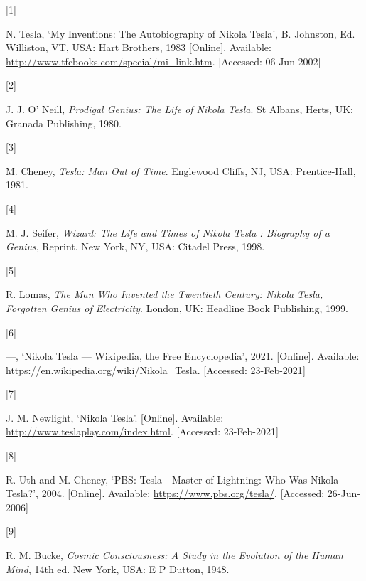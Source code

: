\documentclass[
  12pt,
  british,
  a4paper,
  rgb,
  dvipsnames,
  svgnames,
  hyphens]{article}
\newlength{\cslhangindent}
\newlength{\csllabelwidth}
\newenvironment{CSLReferences}[2] %
 {%
  \setlength{\parindent}{0pt}
  \ifodd #1 \everypar{\setlength{\hangindent}{\cslhangindent}}\ignorespaces\fi
  \ifnum #2 > 0
  \setlength{\parskip}{#2\baselineskip}
  \fi
 }%
 {}
\newcommand{\CSLLeftMargin}[1]{\parbox[t]{\csllabelwidth}{#1}}
\newcommand{\CSLRightInline}[1]{\parbox[t]{\linewidth - \csllabelwidth}{#1}\break}
\begin{document}
\hypertarget{refs}{}
\begin{CSLReferences}{0}{0}
\leavevmode{}%
\CSLLeftMargin{{[}1{]} }
\CSLRightInline{N. Tesla, {`{My Inventions: The Autobiography of Nikola
Tesla}'}, B. Johnston, Ed. Williston, VT, USA: Hart Brothers, 1983
{[}Online{]}. Available:
\url{http://www.tfcbooks.com/special/mi_link.htm}. {[}Accessed:
06-Jun-2002{]}}

\leavevmode{}%
\CSLLeftMargin{{[}2{]} }
\CSLRightInline{J. J. O' Neill, \emph{{Prodigal Genius: The Life of
Nikola Tesla}}. St Albans, Herts, UK: Granada Publishing, 1980. }

\leavevmode{}%
\CSLLeftMargin{{[}3{]} }
\CSLRightInline{M. Cheney, \emph{{Tesla: Man Out of Time}}. Englewood
Cliffs, NJ, USA: Prentice-Hall, 1981. }

\leavevmode{}%
\CSLLeftMargin{{[}4{]} }
\CSLRightInline{M. J. Seifer, \emph{{Wizard: The Life and Times of
Nikola Tesla : Biography of a Genius}}, Reprint. New York, NY, USA:
Citadel Press, 1998. }

\leavevmode{}%
\CSLLeftMargin{{[}5{]} }
\CSLRightInline{R. Lomas, \emph{{The Man Who Invented the Twentieth
Century: Nikola Tesla, Forgotten Genius of Electricity}}. London, UK:
Headline Book Publishing, 1999. }

\leavevmode{}%
\CSLLeftMargin{{[}6{]} }
\CSLRightInline{---, {`{N}ikola {T}esla --- {Wikipedia}{,} the {F}ree
{E}ncyclopedia'}, 2021. {[}Online{]}. Available:
\url{https://en.wikipedia.org/wiki/Nikola_Tesla}. {[}Accessed:
23-Feb-2021{]}}

\leavevmode{}%
\CSLLeftMargin{{[}7{]} }
\CSLRightInline{J. M. Newlight, {`{Nikola Tesla}'}. {[}Online{]}.
Available: \url{http://www.teslaplay.com/index.html}. {[}Accessed:
23-Feb-2021{]}}

\leavevmode{}%
\CSLLeftMargin{{[}8{]} }
\CSLRightInline{R. Uth and M. Cheney, {`{PBS: Tesla---Master of
Lightning: Who Was Nikola Tesla?}'}, 2004. {[}Online{]}. Available:
\url{https://www.pbs.org/tesla/}. {[}Accessed: 26-Jun-2006{]}}

\leavevmode{}%
\CSLLeftMargin{{[}9{]} }
\CSLRightInline{R. M. Bucke, \emph{{Cosmic Consciousness: A Study in the
Evolution of the Human Mind}}, 14th ed. New York, USA: E P Dutton, 1948.
}


\end{CSLReferences}
\end{document}
